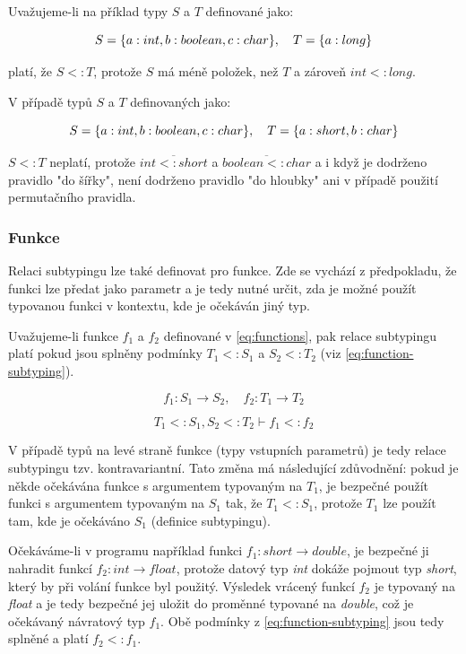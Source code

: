 \documentclass[czech,DP]{thesiskiv}
\begin{document}
Uvažujeme-li na příklad typy $S$ a $T$ definované jako:

\begin{equation}
\centering
	S = \{a:int, b:boolean, c:char\}, \quad
	T = \{a:long\}
\end{equation}

 platí, že $S <: T$, protože $S$ má méně položek, než $T$ a zároveň $int <: long$. 
 
 V případě typů $S$ a $T$ definovaných jako:
 
\begin{equation}
	\centering
	S = \{a:int, b:boolean, c:char\}, \quad
	 T = \{a:short, b:char\}
\end{equation} 

 $S <: T$ neplatí, protože $\overline{int <: short}$ a $\overline{boolean <: char}$ a i když je dodrženo pravidlo "do šířky", není dodrženo pravidlo "do hloubky" ani v případě použití permutačního pravidla.

\subsubsection{Funkce}

Relaci subtypingu lze také definovat pro funkce. Zde se vychází z předpokladu, že funkci lze předat jako parametr a je tedy nutné určit, zda je možné použít typovanou funkci v kontextu, kde je očekáván jiný typ. 

Uvažujeme-li funkce $f_1$ a $f_2$ definované v \ref{eq:functions}, pak relace subtypingu platí pokud jsou splněny podmínky $T_1 <: S_1$ a $S_2 <: T_2$ (viz \ref{eq:function-subtyping}).

\begin{equation}
	f_1: S_1 \rightarrow S_2,\quad f_2: T_1 \rightarrow T_2
	\label{eq:functions}
\end{equation}

\begin{equation}
	T_1 <: S_1, S_2 <: T_2 \vdash f_1 <: f_2
	\label{eq:function-subtyping}
\end{equation}

V případě typů na levé straně funkce (typy vstupních parametrů) je tedy relace subtypingu tzv. kontravariantní. Tato změna má následující zdůvodnění: pokud je někde očekávána funkce s argumentem typovaným na $T_1$, je bezpečné použít funkci s argumentem typovaným na $S_1$ tak, že $T_1 <: S_1$, protože $T_1$ lze použít tam, kde je očekáváno $S_1$ (definice subtypingu). 

Očekáváme-li v programu například funkci $f_1: short \rightarrow double$, je bezpečné ji nahradit funkcí $f_2: int \rightarrow float$, protože datový typ \textit{int} dokáže pojmout typ \textit{short}, který by při volání funkce byl použitý. Výsledek vrácený funkcí $f_2$ je typovaný na \textit{float} a je tedy bezpečné jej uložit do proměnné typované na \textit{double}, což je očekávaný návratový typ $f_1$. Obě podmínky z \ref{eq:function-subtyping} jsou tedy splněné a platí $f_2 <: f_1$.
\end{document}
